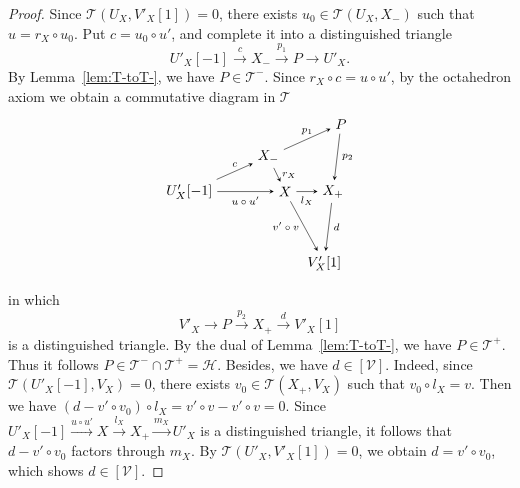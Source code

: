 \documentclass[a4paper,reqno,10pt]{amsart}
\theoremstyle{definition}
\theoremstyle{definition}
\theoremstyle{definition}
\theoremstyle{definition}
\theoremstyle{plain}
\newcommand{\CH}{\mathcal{H}}
\newcommand{\CT}{\mathcal{T}}
\newcommand{\CV}{\mathcal{V}}
\begin{document}
\begin{proof}
Since $\CT(U_X,V'_X[1])=0$, there exists $u_0\in\CT(U_X,X_-)$ such that $u=r_X\circ u_0$. Put $c=u_0\circ u'$, and complete it into a distinguished triangle
\begin{equation}\label{triangle_UXP}
U'_X[-1]\xrightarrow{c}X_-\xrightarrow{p_1}P\to U'_X.
\end{equation}
By Lemma~\ref{lem:T-toT-}, we have $P\in\CT^-$.
Since $r_X\circ c=u\circ u'$, by the octahedron axiom we obtain a commutative diagram in $\CT$
\[
\begin{tikzpicture}[>=stealth]
\node (1) at (-2.4,0) {$U'_X[-1]$};
\node (2) at (-0.42,0.88) {$X_-$};
\node (3) at (1.4,1.7) {$P$};
\node (4) at (0,0) {$X$};
\node (5) at (1.2,0) {$X_+$};
\node (6) at (0.98,-1.8) {$V'_X[1]$};
\draw[->] (1) -- node[above, font=\scriptsize] {$c$} (2);
\draw[->] (1) -- node[below,font=\scriptsize] {$u\circ u'$} (4);
\draw[->] (2) -- node[above,font=\scriptsize] {$p_1$} (3);
\draw[->] (2) -- node[right,font=\scriptsize] {$r_X$} (4);
\draw[->] (3) -- node[right,font=\scriptsize] {$p_2$} (5);
\draw[->] (4) -- node[below,font=\scriptsize] {$l_X$} (5);
\draw[->] (4) -- node[left,font=\scriptsize] {$v'\circ v$} (6);
\draw[->] (5) -- node[right, font=\scriptsize] {$d$} (6);
\end{tikzpicture}
\]
in which
\begin{equation}\label{triangle_PXV}
V'_X\to P\xrightarrow{p_2}X_+\xrightarrow{d}V'_X[1]
\end{equation}
is a distinguished triangle.
By the dual of Lemma~\ref{lem:T-toT-}, we have $P\in\CT^+$. Thus it follows $P\in\CT^-\cap\CT^+=\CH$. Besides, we have $d\in [\CV]$. Indeed, since $\CT(U'_X[-1],V_X)=0$, there exists $v_0\in\CT(X_+,V_X)$ such that $v_0\circ l_X=v$. Then we have $(d-v'\circ v_0)\circ l_X=v'\circ v-v'\circ v=0$. Since $U'_X[-1]\xrightarrow{u\circ u'} X\xrightarrow{l_X} X_+\xrightarrow{m_X} U'_X
$ is a distinguished triangle, it follows that $d-v'\circ v_0$ factors through $m_X$. By $\CT(U'_X,V'_X[1])=0$, we obtain $d=v'\circ v_0$, which shows $d\in [\CV]$.


\end{proof}
\end{document}
